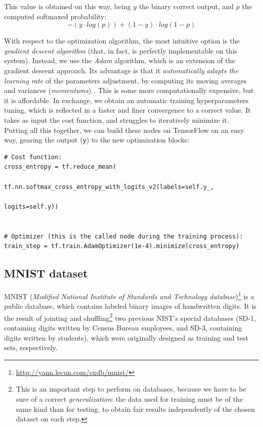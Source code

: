 			This value is obtained on this way, being $y$ the binary correct output, and $p$ the computed softmaxed probability:\\
			
			\begin{equation}
				-(y \cdot log(p)) + (1-y) \cdot log(1-p)
			\end{equation}
		
			With respect to the optimization algorithm, the most intuitive option is the \emph{gradient descent algorithm} (that, in fact, is perfectly implementable on this system). Instead, we use the \emph{Adam} algorithm, which is an extension of the gradient descent approach. Its advantage is that it \emph{automatically adapts the learning rate} of the parameters adjustment, by computing its moving averages and variances (\emph{momentums}) \cite{adam-optimizer}. This is some more computationally expensive, but it is affordable. In exchange, we obtain an automatic training hyperparameters tuning, which is reflected in a faster and finer convergence to a correct value. It takes as input the cost function, and struggles to iteratively minimize it.\\
			
			
			Putting all this together, we can build these nodes on TensorFlow on an easy way, gearing the output (\texttt{y}) to the new optimization blocks:
			
			\begin{lstlisting}
# Cost function:
cross_entropy = tf.reduce_mean(
                  tf.nn.softmax_cross_entropy_with_logits_v2(labels=self.y_,
                                                                  logits=self.y))


# Optimizer (this is the called node during the training process):
train_step = tf.train.AdamOptimizer(1e-4).minimize(cross_entropy)

			\end{lstlisting}
		
		\subsection{MNIST dataset}
			\label{sec:4_mnist}
			MNIST (\emph{Modified National Institute of Standards and Technology database})\footnote{\url{http://yann.lecun.com/exdb/mnist/}} is a public database, which contains labeled binary images of handwritten digits. It is the result of jointing and shuffling\footnote{This is an important step to perform on databases, because we have to be sure of a correct \emph{generalization}: the data used for training must be of the same kind than for testing, to obtain fair results independently of the chosen dataset on each step.} two previous NIST's special databases (SD-1, containing digits written by Census Bureau employees, and SD-3, containing digits written by students), which were originally designed as training and test sets, respectively.\\
			
